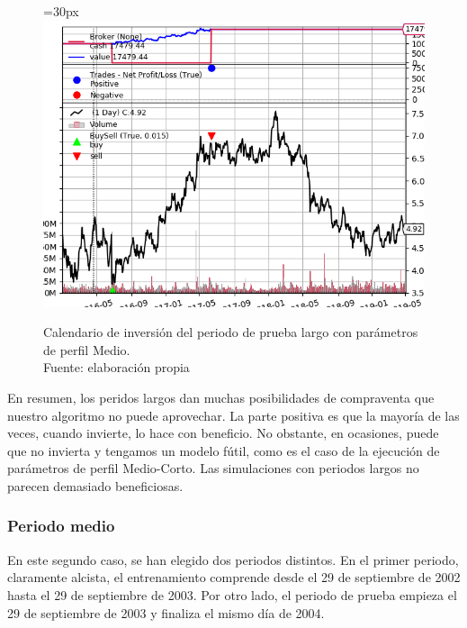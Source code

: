      	\begin{figure}[H]
     		\centering\leftskip=30px
     		\includegraphics[scale=0.70]{imagenes/L_Medium_test.png}
     		\caption[Calendario de inversi\'on del periodo de prueba largo]{Calendario de inversi\'on del periodo de prueba largo con par\'ametros de perfil Medio.\\ Fuente: elaboraci\'on propia}
     		\label{fig:large_period_mtest}
     	\end{figure}     	

En resumen, los peridos largos dan muchas posibilidades de compraventa que nuestro algoritmo no puede aprovechar. La parte positiva es que la mayor\'ia de las veces, cuando invierte, lo hace con beneficio. No obstante, en ocasiones, puede que no invierta y tengamos un modelo f\'util, como es el caso de la ejecuci\'on de par\'ametros de perfil Medio-Corto. Las simulaciones con periodos largos no parecen demasiado beneficiosas.\\

\subsubsection{Periodo medio}

En este segundo caso, se han elegido dos periodos distintos. En el primer periodo, claramente alcista, el entrenamiento comprende desde el 29 de septiembre de 2002 hasta el 29 de septiembre de 2003. Por otro lado, el periodo de prueba empieza el 29 de septiembre de 2003 y finaliza el mismo d\'ia de 2004. \\

